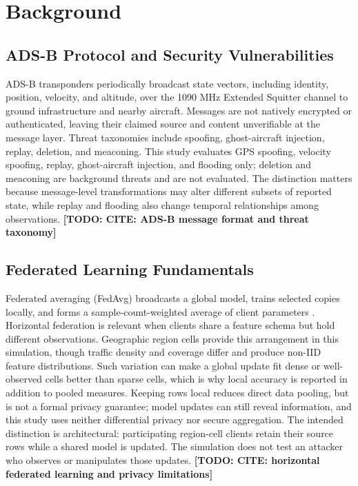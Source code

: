 \documentclass[conference]{IEEEtran}
\newcommand{\todo}[1]{\textbf{[TODO: #1]}}
\begin{document}
\section{Background}

\subsection{ADS-B Protocol and Security Vulnerabilities}

ADS-B transponders periodically broadcast state vectors, including identity, position, velocity, and altitude, over the 1090 MHz Extended Squitter channel to ground infrastructure and nearby aircraft. Messages are not natively encrypted or authenticated, leaving their claimed source and content unverifiable at the message layer. Threat taxonomies include spoofing, ghost-aircraft injection, replay, deletion, and meaconing. This study evaluates GPS spoofing, velocity spoofing, replay, ghost-aircraft injection, and flooding only; deletion and meaconing are background threats and are not evaluated. The distinction matters because message-level transformations may alter different subsets of reported state, while replay and flooding also change temporal relationships among observations. \todo{CITE: ADS-B message format and threat taxonomy}



\subsection{Federated Learning Fundamentals}

Federated averaging (FedAvg) broadcasts a global model, trains selected copies locally, and forms a sample-count-weighted average of client parameters \cite{mcmahan2017}. Horizontal federation is relevant when clients share a feature schema but hold different observations. Geographic region cells provide this arrangement in this simulation, though traffic density and coverage differ and produce non-IID feature distributions. Such variation can make a global update fit dense or well-observed cells better than sparse cells, which is why local accuracy is reported in addition to pooled measures. Keeping rows local reduces direct data pooling, but is not a formal privacy guarantee; model updates can still reveal information, and this study uses neither differential privacy nor secure aggregation. The intended distinction is architectural: participating region-cell clients retain their source rows while a shared model is updated. The simulation does not test an attacker who observes or manipulates those updates. \todo{CITE: horizontal federated learning and privacy limitations}
\end{document}
